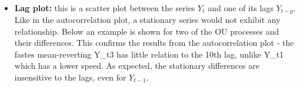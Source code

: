\documentclass{article}
\providecommand{\tightlist}{%
      \setlength{\itemsep}{0pt}\setlength{\parskip}{0pt}}
\begin{document}
    \begin{center}
    \end{center}
    { \hspace*{\fill} \\}
    
    \begin{itemize}
\tightlist
\item
  \textbf{Lag plot:} this is a scatter plot between the series \(Y_t\)
  and one of its lags \(Y_{t-p}\). Like in the autocorrelation plot, a
  stationary series would not exhibit any relationship. Below an example
  is shown for two of the OU processes and their differences. This
  confirms the results from the autocorrelation plot - the fastes
  mean-reverting Y\_t3 has little relation to the 10th lag, unlike Y\_t1
  which has a lower speed. As expected, the stationary differences are
  insensitive to the lags, even for \(Y_{t-1}\).
\end{itemize}
\end{document}

